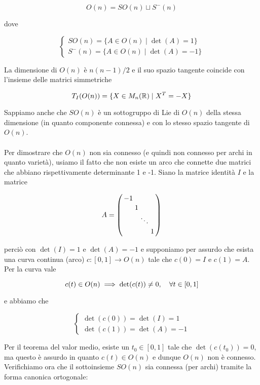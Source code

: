 \begin{equation}
	O(n) = SO(n) \sqcup S^{-}(n)
\end{equation}

dove

\begin{equation}
	\begin{cases}
		SO(n) = \{ A \in O(n) \mid \det(A) = 1 \}\\
		S^{-}(n) = \{ A \in O(n) \mid \det(A) = -1 \}
	\end{cases}
\end{equation}

La dimensione di $ O(n) $ è $ n(n-1)/2 $ e il suo spazio tangente coincide con l'insieme delle matrici simmetriche

\begin{equation}
	T_{I}(O(n)) = \{ X \in M_{n}(\mathbb{R}) \mid X^{T} = -X \}
\end{equation}

Sappiamo anche che $ SO(n) $ è un sottogruppo di Lie di $ O(n) $ della stessa dimensione (in quanto componente connessa) e con lo stesso spazio tangente di $ O(n) $.\\\\
%
Per dimostrare che $ O(n) $ non sia connesso (e quindi non connesso per archi in quanto varietà), usiamo il fatto che non esiste un arco che connette due matrici che abbiano rispettivamente determinante 1 e -1. Siano la matrice identità $ I $ e la matrice

\begin{equation}
	A = \smqty(\dmat{-1,1,\ddots,1})
\end{equation}

perciò con $ \det(I) = 1 $ e $ \det(A) = -1 $ e supponiamo per assurdo che esista una curva continua (arco) $ c : [0,1] \to O(n) $ tale che $ c(0) = I $ e $ c(1) = A $. Per la curva vale

\begin{equation}
	c(t) \in O(n) \implies \det(c(t)) \neq 0 \qcomma \forall t \in [0,1]
\end{equation}

e abbiamo che

\begin{equation}
	\begin{cases}
		\det(c(0)) = \det(I) = 1\\
		\det(c(1)) = \det(A) = -1
	\end{cases}
\end{equation}

Per il teorema del valor medio, esiste un $ t_{0} \in [0,1] $ tale che $ \det(c(t_{0})) = 0 $, ma questo è assurdo in quanto $ c(t) \in O(n) $ e dunque $ O(n) $ non è connesso.\\
Verifichiamo ora che il sottoinsieme $ SO(n) $ sia connessa (per archi) tramite la forma canonica ortogonale:


